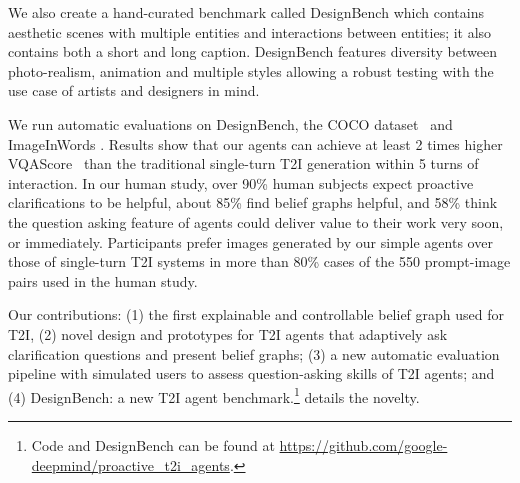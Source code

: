 We also create a hand-curated benchmark called DesignBench which contains aesthetic scenes with multiple entities and interactions between entities; it also contains both a short and long caption. DesignBench features diversity between photo-realism, animation and multiple styles allowing a robust testing with the use case of artists and designers in mind. 

We run automatic evaluations on DesignBench, the COCO dataset~\citep{lin2014microsoft} and ImageInWords \citep{garg2024imageinwordsunlockinghyperdetailedimage}.  Results show that our agents can achieve at least 2 times higher VQAScore~\citep{lin2024evaluatingtexttovisualgenerationimagetotext} than the traditional single-turn T2I generation within 5 turns of interaction. In our human study, over 90\% human subjects expect proactive clarifications to be helpful, about 85\% find belief graphs helpful, and 58\% think the question asking feature of agents could deliver value to their work very soon, or immediately. Participants prefer images generated by our simple agents over those of single-turn T2I systems in more than 80\% cases of the 550 prompt-image pairs used in the human study.

Our contributions: (1) the first explainable and controllable belief graph used for T2I, (2) novel design and prototypes for T2I agents that adaptively ask clarification questions and present belief graphs; (3) a new automatic evaluation pipeline with simulated users to assess question-asking skills of T2I agents; and (4) DesignBench: a new T2I agent benchmark.\footnote{Code and  DesignBench can be found at \url{https://github.com/google-deepmind/proactive_t2i_agents}.}  details the novelty.








